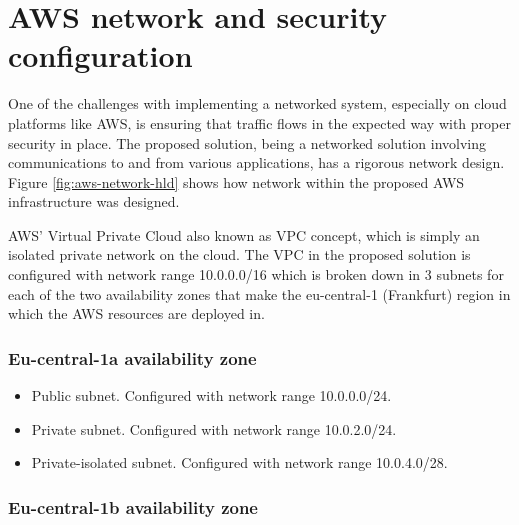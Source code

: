 


\section{AWS network and security configuration}
\label{sec:aws-network}

One of the challenges with implementing a networked system, especially on cloud platforms like AWS, is ensuring that traffic flows in the expected way with proper security in place. The proposed solution, being a networked solution involving communications to and from various applications, has a rigorous network design. Figure \ref{fig:aws-network-hld} shows how network within the proposed AWS infrastructure was designed.

AWS' Virtual Private Cloud also known as VPC concept, which is simply an isolated private network on the cloud. The VPC in the proposed solution is configured with network range 10.0.0.0/16 which is broken down in 3 subnets for each of the two availability zones that make the eu-central-1 (Frankfurt) region in which the AWS resources are deployed in.



\subsubsection*{Eu-central-1a availability zone}
\label{eu-central-1a-az}

\begin{itemize}
    \item Public subnet. Configured with network range 10.0.0.0/24.
    \item Private subnet. Configured with network range 10.0.2.0/24.
    \item Private-isolated subnet. Configured with network range 10.0.4.0/28.
\end{itemize}




\subsubsection*{Eu-central-1b availability zone}
\label{eu-central-1b-az}


